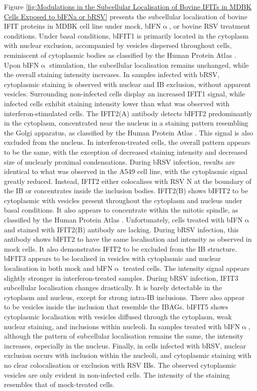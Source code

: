 Figure \ref{fig:Modulations in the Subcellular Localisation of Bovine IFITs in MDBK Cells Exposed to bIFNa or bRSV} presents the subcellular localisation of bovine IFIT proteins in MDBK cell line under mock, bIFN$\upalpha$, or bovine RSV treatment conditions. Under basal conditions, bIFIT1 is primarily located in the cytoplasm with nuclear exclusion, accompanied by vesicles dispersed throughout cells, reminiscent of cytoplasmic bodies as classified by the Human Protein Atlas \cite{Thul2017AProteome}. Upon bIFN$\upalpha$ stimulation, the subcellular localisation remains unchanged, while the overall staining intensity increases. In samples infected with bRSV, cytoplasmic staining is observed with nuclear and IB exclusion, without apparent vesicles. Surrounding non-infected cells display an increased IFIT1 signal, while infected cells exhibit staining intensity lower than what was observed with interferon-stimulated cells. The IFIT2(A) antibody detects bIFIT2 predominantly in the cytoplasm, concentrated near the nucleus in a staining pattern resembling the Golgi apparatus, as classified by the Human Protein Atlas \cite{Thul2017AProteome}. This signal is also excluded from the nucleus. In interferon-treated cells, the overall pattern appears to be the same, with the exception of decreased staining intensity and decreased size of nuclearly proximal condensations. During bRSV infection, results are identical to what was observed in the A549 cell line, with the cytoplasmic signal greatly reduced. Instead, IFIT2 either colocalises with RSV N at the boundary of the IB or concentrates inside the inclusion bodies. IFIT2(B) shows bIFIT2 to be cytoplasmic with vesicles present throughout the cytoplasm and nucleus under basal conditions. It also appears to concentrate within the mitotic spindle, as classified by the Human Protein Atlas \cite{Thul2017AProteome}. Unfortunately, cells treated with bIFN$\upalpha$ and stained with IFIT2(B) antibody are lacking. During bRSV infection, this antibody shows bIFIT2 to have the same localisation and intensity as observed in mock cells. It also demonstrates IFIT2 to be excluded from the IB structure. bIFIT3 appears to be localised in vesicles with cytoplasmic and nuclear localisation in both mock and bIFN$\upalpha$ treated cells. The intensity signal appears slightly stronger in interferon-treated samples. During bRSV infection, IFIT3 subcellular localisation changes drastically. It is barely detectable in the cytoplasm and nucleus, except for strong intra-IB inclusions. There also appear to be vesicles inside the inclusion that resemble the IBAGs. bIFIT5 shows cytoplasmic localisation with vesicles diffused through the cytoplasm, weak nuclear staining, and inclusions within nucleoli. In samples treated with bIFN$\upalpha$, although the pattern of subcellular localisation remains the same, the intensity increases, especially in the nucleus. Finally, in cells infected with bRSV, nuclear exclusion occurs with inclusion within the nucleoli, and cytoplasmic staining with no clear colocalisation or exclusion with RSV IBs. The observed cytoplasmic vesicles are only evident in non-infected cells. The intensity of the staining resembles that of mock-treated cells.

